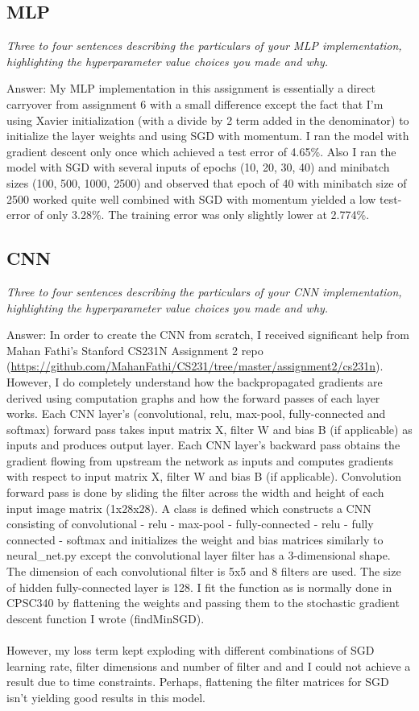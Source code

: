 \documentclass{article}
\def\ans#1{\par\gre{Answer: #1}}{}
\def\gre#1{{\color{gre}#1}}
\begin{document}
\subsection{MLP}
\emph{Three to four sentences describing the particulars of your MLP implementation, highlighting the hyperparameter value choices you made and why.}
\ans{My MLP implementation in this assignment is essentially a direct carryover from assignment 6 with a small difference except the fact that I'm using Xavier initialization (with a divide by 2 term added in the denominator) to initialize the layer weights and using SGD with momentum. I ran the model with gradient descent only once which achieved a test error of 4.65\%. Also I ran the model with SGD with several inputs of epochs (10, 20, 30, 40) and minibatch sizes (100, 500, 1000, 2500) and observed that epoch of 40 with minibatch size of 2500 worked quite well combined with SGD with momentum yielded a low test-error of only 3.28\%. The training error was only slightly lower at 2.774\%.}
\subsection{CNN}
\emph{Three to four sentences describing the particulars of your CNN implementation, highlighting the hyperparameter value choices you made and why.}
\ans{In order to create the CNN from scratch, I received significant help from Mahan Fathi's Stanford CS231N Assignment 2 repo (\url{https://github.com/MahanFathi/CS231/tree/master/assignment2/cs231n}). However, I do completely understand how the backpropagated gradients are derived using computation graphs and how the forward passes of each layer works. Each CNN layer's (convolutional, relu, max-pool, fully-connected and softmax) forward pass takes input matrix X, filter W and bias B (if applicable) as inputs and produces output layer. Each CNN layer's backward pass obtains the gradient flowing from upstream the network as inputs and computes gradients with respect to input matrix X, filter W and bias B (if applicable). Convolution forward pass is done by sliding the filter across the width and height of each input image matrix (1x28x28). A class is defined which constructs a CNN consisting of convolutional - relu - max-pool - fully-connected - relu - fully connected - softmax and initializes the weight and bias matrices similarly to neural\_net.py except the convolutional layer filter has a 3-dimensional shape. The dimension of each convolutional filter is 5x5 and 8 filters are used. The size of hidden fully-connected layer is 128. I fit the function as is normally done in CPSC340 by flattening the weights and passing them to the stochastic gradient descent function I wrote (findMinSGD). \\ \\ However, my loss term kept exploding with different combinations of SGD learning rate, filter dimensions and number of filter and and I could not achieve a result due to time constraints. Perhaps, flattening the filter matrices for SGD isn't yielding good results in this model.}
\end{document}
